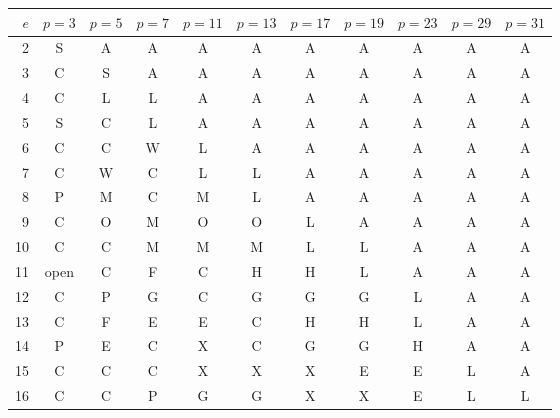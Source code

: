 \begin{tabular}{@{}rcccccccccc@{}}
\toprule
$e$ & $p=3$ & $p=5$ & $p=7$ & $p=11$ & $p=13$ & $p=17$ & $p=19$ & $p=23$ & $p=29$ & $p=31$\\
\midrule
2 & S & A & A & A & A & A & A & A & A & A\\
3 & C & S & A & A & A & A & A & A & A & A\\
4 & C & L & L & A & A & A & A & A & A & A\\
5 & S & C & L & A & A & A & A & A & A & A\\
6 & C & C & W & L & A & A & A & A & A & A\\
7 & C & W & C & L & L & A & A & A & A & A\\
8 & P & M & C & M & L & A & A & A & A & A\\
9 & C & O & M & O & O & L & A & A & A & A\\
10 & C & C & M & M & M & L & L & A & A & A\\
11 & open & C & F & C & H & H & L & A & A & A\\
12 & C & P & G & C & G & G & G & L & A & A\\
13 & C & F & E & E & C & H & H & L & A & A\\
14 & P & E & C & X & C & G & G & H & A & A\\
15 & C & C & C & X & X & X & E & E & L & A\\
16 & C & C & P & G & G & X & X & E & L & L\\
\bottomrule
\end{tabular}
